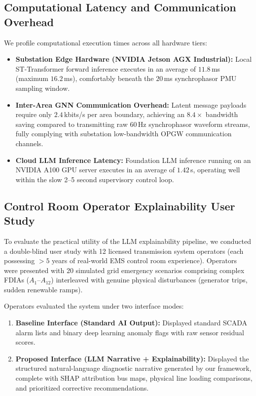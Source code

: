\documentclass[journal,compsoc]{IEEEtran}
\begin{document}
\subsection{Computational Latency and Communication Overhead}
We profile computational execution times across all hardware tiers:
\begin{itemize}
    \item \textbf{Substation Edge Hardware (NVIDIA Jetson AGX Industrial):} Local ST-Transformer forward inference executes in an average of $11.8$\,ms (maximum $16.2$\,ms), comfortably beneath the $20$\,ms synchrophasor PMU sampling window.
    \item \textbf{Inter-Area GNN Communication Overhead:} Latent message payloads require only $2.4$\,kbits/s per area boundary, achieving an $8.4\times$ bandwidth saving compared to transmitting raw 60\,Hz synchrophasor waveform streams, fully complying with substation low-bandwidth OPGW communication channels.
    \item \textbf{Cloud LLM Inference Latency:} Foundation LLM inference running on an NVIDIA A100 GPU server executes in an average of $1.42$\,s, operating well within the slow 2--5 second supervisory control loop.
\end{itemize}

\subsection{Control Room Operator Explainability User Study}
To evaluate the practical utility of the LLM explainability pipeline, we conducted a double-blind user study with 12 licensed transmission system operators (each possessing $>5$ years of real-world EMS control room experience). Operators were presented with 20 simulated grid emergency scenarios comprising complex FDIAs ($A_1$--$A_{12}$) interleaved with genuine physical disturbances (generator trips, sudden renewable ramps).

Operators evaluated the system under two interface modes:
\begin{enumerate}
    \item \textbf{Baseline Interface (Standard AI Output):} Displayed standard SCADA alarm lists and binary deep learning anomaly flags with raw sensor residual scores.
    \item \textbf{Proposed Interface (LLM Narrative + Explainability):} Displayed the structured natural-language diagnostic narrative generated by our framework, complete with SHAP attribution bus maps, physical line loading comparisons, and prioritized corrective recommendations.
\end{enumerate}
\end{document}
